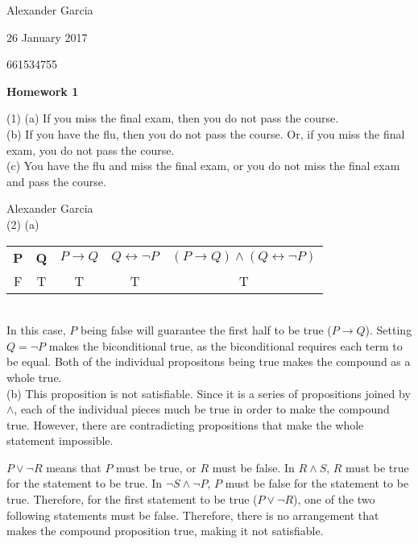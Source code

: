 \documentclass[]{article}
\def\OR{\vee}
\def\AND{\wedge}
\def\imp{\rightarrow}
\begin{document}
Alexander Garcia

26 January 2017

661534755

\centerline{\bf \Large Homework 1}

\medskip

\noindent (1) (a) If you miss the final exam, then you do not pass the course. \\

(b) If you have the flu, then you do not pass the course. Or, if you miss the final exam, you do not pass the course. \\

(c) You have the flu and miss the final exam, or you do not miss the final exam and pass the course. \\

\newpage

Alexander Garcia\\

\noindent (2) (a)
\begin{tabular}{c c | c c | c}
	\textbf{P} & \textbf{Q} & $P \imp Q$  & $Q \leftrightarrow \neg P$ & $(P \imp Q) \AND (Q \leftrightarrow \neg P)$\\
	F & T & T & T & T\\
\end{tabular} \\

In this case, $P$ being false will guarantee the first half to be true ($P \imp Q$). Setting $Q = \neg P$ makes the biconditional true, as the biconditional requires each term to be equal. Both of the individual propositons being true makes the compound as a whole true.
\\

(b) This proposition is not satisfiable. Since it is a series of propositions joined by $\AND$, each of the individual pieces much be true in order to make the compound true. However, there are contradicting propositions that make the whole statement impossible. 

$P \OR \neg R$ means that $P$ must be true, or $R$ must be false. In $R \AND S$, $R$ must be true for the statement to be true. In $\neg S \AND \neg P$, $P$ must be false for the statement to be true. Therefore, for the first statement to be true ($P \OR \neg R$), one of the two following statements must be false. Therefore, there is no arrangement that makes the compound proposition true, making it not satisfiable.\\
\end{document}

